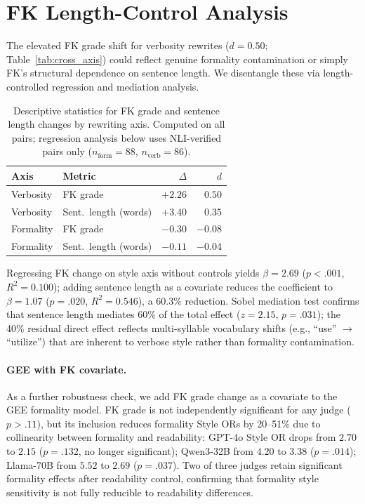 \section{FK Length-Control Analysis}
\label{app:fk_length}

The elevated FK grade shift for verbosity rewrites ($d = 0.50$; Table~\ref{tab:cross_axis}) could reflect genuine formality contamination or simply FK's structural dependence on sentence length.
We disentangle these via length-controlled regression and mediation analysis.

\begin{table}[h]
\centering
\small
\caption{Descriptive statistics for FK grade and sentence length changes by rewriting axis. Computed on all pairs; regression analysis below uses NLI-verified pairs only ($n_{\text{form}} = 88$, $n_{\text{verb}} = 86$).}
\label{tab:fk_desc}
\begin{tabular}{@{}llrr@{}}
\toprule
Axis & Metric & $\Delta$ & $d$ \\
\midrule
Verbosity & FK grade & $+2.26$ & $0.50$ \\
Verbosity & Sent.\ length (words) & $+3.40$ & $0.35$ \\
Formality & FK grade & $-0.30$ & $-0.08$ \\
Formality & Sent.\ length (words) & $-0.11$ & $-0.04$ \\
\bottomrule
\end{tabular}
\end{table}

Regressing FK change on style axis without controls yields $\beta = 2.69$ ($p < .001$, $R^2 = 0.100$); adding sentence length as a covariate reduces the coefficient to $\beta = 1.07$ ($p = .020$, $R^2 = 0.546$), a 60.3\% reduction.
Sobel mediation test confirms that sentence length mediates 60\% of the total effect ($z = 2.15$, $p = .031$); the 40\% residual direct effect reflects multi-syllable vocabulary shifts (e.g., ``use'' $\to$ ``utilize'') that are inherent to verbose style rather than formality contamination.

\paragraph{GEE with FK covariate.}
As a further robustness check, we add FK grade change as a covariate to the GEE formality model.
FK grade is not independently significant for any judge ($p > .11$), but its inclusion reduces formality Style ORs by 20--51\% due to collinearity between formality and readability: GPT-4o Style OR drops from $2.70$ to $2.15$ ($p = .132$, no longer significant); Qwen3-32B from $4.20$ to $3.38$ ($p = .014$); Llama-70B from $5.52$ to $2.69$ ($p = .037$).
Two of three judges retain significant formality effects after readability control, confirming that formality style sensitivity is not fully reducible to readability differences.

